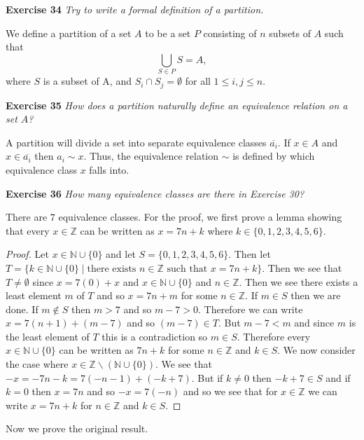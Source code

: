 \documentclass{article}
\begin{document}
\begin{flushleft}
\textbf{Exercise 34}
\textsl{Try to write a formal definition of a partition.}\newline

We define a partition of a set $A$ to be a set $P$ consisting of $n$ subsets of $A$ such that
\[
\bigcup_{S \in P} S = A,
\]
where $S$ is a subset of A, and $S_i \cap S_j =\emptyset$ for all $1 \leq i,j \leq n$.\newline

\textbf{Exercise 35}
\textsl{How does a partition naturally define an equivalence relation on a set $A$?}\newline

A partition will divide a set into separate equivalence classes $\overline{a_i}$. If $x \in A$ and $x \in \overline{a_i}$ then $a_i \sim x$. Thus, the equivalence relation $\sim$ is defined by which equivalence class $x$ falls into.\newline

\textbf{Exercise 36}
\textsl{How many equivalence classes are there in Exercise 30?}\newline

There are $7$ equivalence classes. For the proof, we first prove a lemma showing that every $x \in \mathbb{Z}$ can be written as $x=7n+k$ where $k \in \{0,1,2,3,4,5,6\}$.

\begin{proof}
Let $x \in \mathbb{N} \cup \{0\}$ and let $S=\{0,1,2,3,4,5,6\}$. Then let $T=\{k \in \mathbb{N} \cup \{0\} \mid \text{there exists } n \in \mathbb{Z} \text{ such that } x = 7n+k\}$. Then we see that $T \neq \emptyset$ since $x = 7(0) + x$ and $x \in \mathbb{N} \cup \{0\}$ and $n \in \mathbb{Z}$. Then we see there exists a least element $m$ of $T$ and so $x=7n+m$ for some $n \in \mathbb{Z}$. If $m \in S$ then we are done. If $m \notin S$ then $m > 7$ and so $m - 7 > 0$. Therefore we can write $x=7(n+1)+(m-7)$ and so $(m-7) \in T$. But $m-7<m$ and since $m$ is the least element of $T$ this is a contradiction so $m \in S$. Therefore every $x \in \mathbb{N} \cup \{0\}$ can be written as $7n+k$ for some $n \in \mathbb{Z}$ and $k \in S$. We now consider the case where $x \in \mathbb{Z} \backslash (\mathbb{N} \cup \{0\})$. We see that $-x = -7n-k = 7(-n-1) + (-k+7)$. But if $k \neq 0$ then $-k+7 \in S$ and if $k=0$ then $x=7n$ and so $-x=7(-n)$ and so we see that for $x \in \mathbb{Z}$ we can write $x=7n+k$ for $n \in \mathbb{Z}$ and $k \in S$.
\end{proof}

Now we prove the original result.


\end{flushleft}
\end{document}

